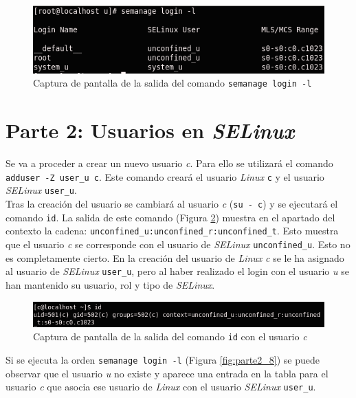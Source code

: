 \documentclass[10pt,a4paper]{article}
\begin{document}
\begin{figure}[h!]
\centering
\includegraphics[scale=0.5]{images/parte1_5d.png}
\caption{Captura de pantalla de la salida del comando \texttt{semanage login -l}}
\label{fig:parte1_5d}
\end{figure}

\newpage
\section{Parte 2: Usuarios en \emph{SELinux}}

Se va a proceder a crear un nuevo usuario \emph{c}. Para ello se utilizará el comando \texttt{adduser -Z user\_{}u c}. Este comando creará el usuario \emph{Linux} \texttt{c} y el usuario \emph{SELinux} \texttt{user\_{}u}.\\
Tras la creación del usuario se cambiará al usuario \emph{c} (\texttt{su - c}) y se ejecutará el comando \texttt{id}. La salida de este comando (Figura \ref{fig:parte2_7}) muestra en el apartado del contexto la cadena: \texttt{unconfined\_{}u:unconfined\_{}r:unconfined\_{}t}. Esto muestra que el usuario \emph{c} se corresponde con el usuario de \emph{SELinux} \texttt{unconfined\_{}u}. Esto no es completamente cierto. En la creación del usuario de \emph{Linux} \emph{c} se le ha asignado al usuario de \emph{SELinux} \texttt{user\_{}u}, pero al haber realizado el login con el usuario \emph{u} se han mantenido su usuario, rol y tipo de \emph{SELinux}.\\

\begin{figure}[h!]
\centering
\includegraphics[scale=0.5]{images/parte2_7.png}
\caption{Captura de pantalla de la salida del comando \texttt{id} con el usuario \emph{c}}
\label{fig:parte2_7}
\end{figure}

Si se ejecuta la orden \texttt{semanage login -l} (Figura \ref{fig:parte2_8}) se puede observar que el usuario \emph{u} no existe y aparece una entrada en la tabla para el usuario \emph{c} que asocia ese usuario de \emph{Linux} con el usuario \emph{SELinux} \texttt{user\_{}u}.
\end{document}
